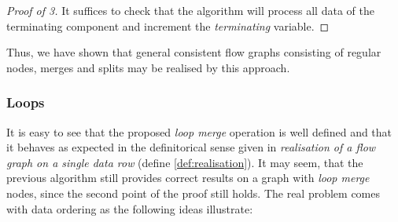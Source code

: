 \begin{proof}[Proof of 3]
It suffices to check that the algorithm will process all data of the terminating component and increment the \emph{terminating} variable.
\end{proof}
\myendclaim

Thus, we have shown that general consistent flow graphs consisting of regular nodes, merges and splits may be realised by this approach.

\subsubsection{Loops}

It is easy to see that the proposed \emph{loop merge} operation is well defined and that it behaves as expected in the definitorical sense given in \emph{realisation of a flow graph on a single data row} (define \ref{def:realisation}). It may seem, that the previous algorithm still provides correct results on a graph with \emph{loop merge} nodes, since the second point of the proof still holds. The real problem comes with data ordering as the following ideas illustrate:
